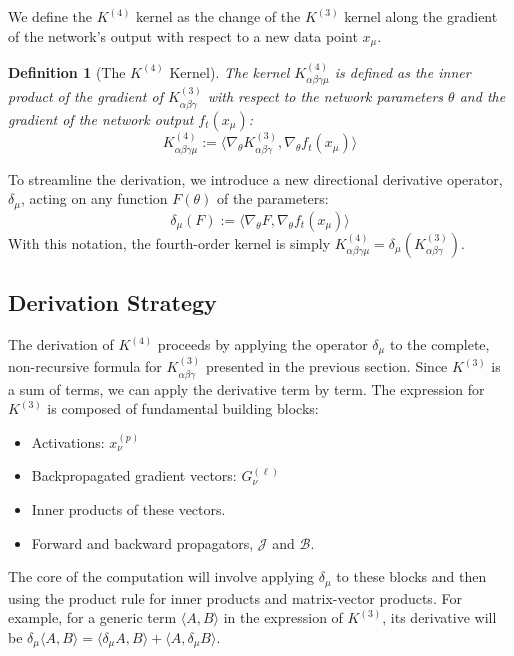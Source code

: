 \documentclass[11pt,a4paper]{article}
\newtheorem{definition}[theorem]{Definition}
\theoremstyle{definition}
\begin{document}
We define the $K^{(4)}$ kernel as the change of the $K^{(3)}$ kernel along the gradient of the network's output with respect to a new data point $x_\mu$.
\begin{definition}[The $K^{(4)}$ Kernel]
The kernel $K^{(4)}_{\alpha\beta\gamma\mu}$ is defined as the inner product of the gradient of $K^{(3)}_{\alpha\beta\gamma}$ with respect to the network parameters $\theta$ and the gradient of the network output $f_t(x_\mu)$:
\begin{equation}
K^{(4)}_{\alpha\beta\gamma\mu} := \langle \nabla_\theta K^{(3)}_{\alpha\beta\gamma}, \nabla_\theta f_t(x_\mu) \rangle
\end{equation}
\end{definition}
To streamline the derivation, we introduce a new directional derivative operator, $\delta_\mu$, acting on any function $F(\theta)$ of the parameters:
\begin{equation}
\delta_\mu(F) := \langle \nabla_\theta F, \nabla_\theta f_t(x_\mu) \rangle
\end{equation}
With this notation, the fourth-order kernel is simply $K^{(4)}_{\alpha\beta\gamma\mu} = \delta_\mu(K^{(3)}_{\alpha\beta\gamma})$.

\subsection{Derivation Strategy}

The derivation of $K^{(4)}$ proceeds by applying the operator $\delta_\mu$ to the complete, non-recursive formula for $K^{(3)}_{\alpha\beta\gamma}$ presented in the previous section. Since $K^{(3)}$ is a sum of terms, we can apply the derivative term by term. The expression for $K^{(3)}$ is composed of fundamental building blocks:
\begin{itemize}
    \item Activations: $x^{(p)}_\nu$
    \item Backpropagated gradient vectors: $G^{(\ell)}_\nu$
    \item Inner products of these vectors.
    \item Forward and backward propagators, $\mathcal{J}$ and $\mathcal{B}$.
\end{itemize}
The core of the computation will involve applying $\delta_\mu$ to these blocks and then using the product rule for inner products and matrix-vector products. For example, for a generic term $\langle A, B \rangle$ in the expression of $K^{(3)}$, its derivative will be $\delta_\mu \langle A, B \rangle = \langle \delta_\mu A, B \rangle + \langle A, \delta_\mu B \rangle$.
\end{document}
